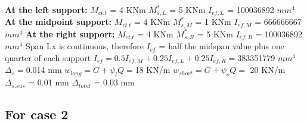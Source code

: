 \documentclass{article}%
\begin{document}
%
\newline%
\newline%
%
\textbf{At the left support:}%
\newline%
\newline%
%
$M_{ct.t}$ = 4 KNm%
\newline%
%
$M_{s,L}^{*}$ = 5 KNm%
\newline%
%
$I_{ef,L}$ = 100036892 $mm^{4}$%
\newline%
\newline%
%
\textbf{At the midpoint support:}%
\newline%
\newline%
%
$M_{ct.t}$ = 4 KNm%
\newline%
%
$M_{s,M}^{*}$ = 1 KNm%
\newline%
%
$I_{ef,M}$ = 666666667 $mm^{4}$%
\newline%
\newline%
%
\textbf{At the right support:}%
\newline%
\newline%
%
$M_{ct.t}$ = 4 KNm%
\newline%
%
$M_{s,R}^{*}$ = 5 KNm%
\newline%
%
$I_{ef,R}$ = 100036892 $mm^{4}$%
\newline%
\newline%
%
Span Lx is continuous, therefore $I_{ef}$ = half the midspan value plus one quarter of each support%
\newline%
\newline%
%
$I_{ef} = 0.5I_{ef,M} + 0.25I_{ef,L} + 0.25I_{ef,R} = $383351779 $ mm^{4}$%
\newline%
\newline%
%
$\Delta_{s} =$0.014 mm%
\newline%
\newline%
%
$w_{long} = G + \psi_{l}Q = $18 KN/m%
\newline%
%
$w_{short} = G + \psi_{s}Q = $ 20 KN/m%
\newline%
\newline%
%
$\Delta_{s.sus}$ = 0.01 mm%
\newline%
\newline%
%
$\Delta_{total}$ = 0.03 mm%
\subsection*{For case 2}%
\label{subsec:Forcase2}%
\end{document}
